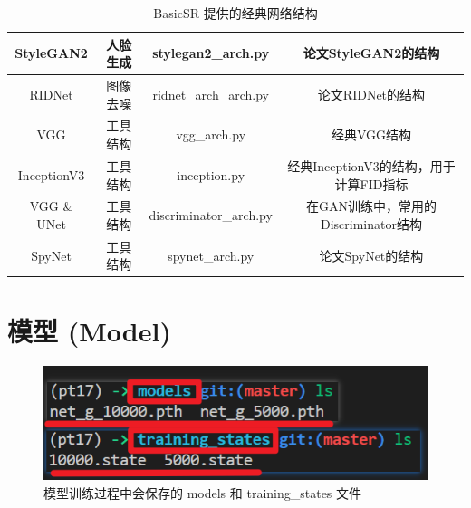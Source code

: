 \documentclass[../main.tex]{subfiles}
\begin{document}
\begin{table}[h]
{\begin{tabular}{|c|c|c|c|}
            StyleGAN2         & 人脸生成      & stylegan2\_arch.py     & 论文StyleGAN2的结构                    \\ \hline
            RIDNet            & 图像去噪      & ridnet\_arch\_arch.py  & 论文RIDNet的结构                       \\ \hline
            VGG               & 工具结构      & vgg\_arch.py           & 经典VGG结构                            \\ \hline
            InceptionV3       & 工具结构      & inception.py           & 经典InceptionV3的结构，用于计算FID指标 \\ \hline
            VGG \& UNet       & 工具结构      & discriminator\_arch.py & 在GAN训练中，常用的Discriminator结构   \\ \hline
            SpyNet            & 工具结构      & spynet\_arch.py        & 论文SpyNet的结构                       \\ \hline
        \end{tabular}
    }
    \caption{BasicSR 提供的经典网络结构}
\end{table}


\section{模型 (Model)}\label{code_structure:model}



\begin{figure}[H]
    \begin{center}
        \includegraphics[width=0.7\linewidth]{figures/getting_start_4.png}
        \caption{模型训练过程中会保存的 models 和 training\_states 文件}
        \label{fig:getting_start_4}
    \end{center}
    \vspace{-0.5cm}
\end{figure}
\end{document}
